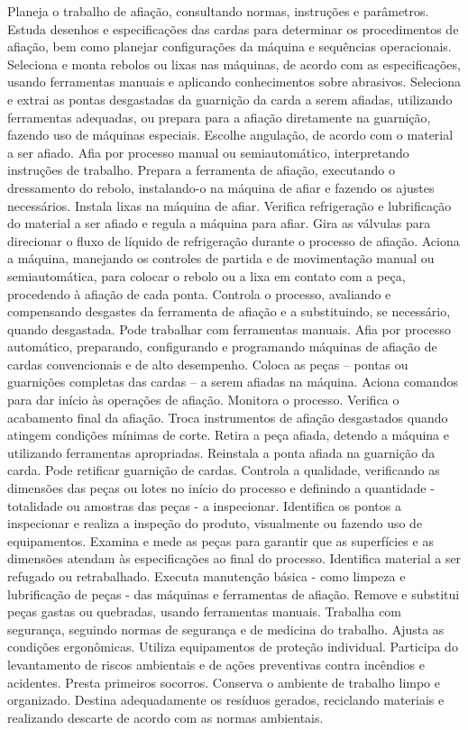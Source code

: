 \documentclass[
]{article}
\begin{document}
Planeja o trabalho de afiação, consultando normas, instruções e
parâmetros. Estuda desenhos e especificações das cardas para determinar
os procedimentos de afiação, bem como planejar configurações da máquina
e sequências operacionais. Seleciona e monta rebolos ou lixas nas
máquinas, de acordo com as especificações, usando ferramentas manuais e
aplicando conhecimentos sobre abrasivos. Seleciona e extrai as pontas
desgastadas da guarnição da carda a serem afiadas, utilizando
ferramentas adequadas, ou prepara para a afiação diretamente na
guarnição, fazendo uso de máquinas especiais. Escolhe angulação, de
acordo com o material a ser afiado. Afia por processo manual ou
semiautomático, interpretando instruções de trabalho. Prepara a
ferramenta de afiação, executando o dressamento do rebolo, instalando-o
na máquina de afiar e fazendo os ajustes necessários. Instala lixas na
máquina de afiar. Verifica refrigeração e lubrificação do material a ser
afiado e regula a máquina para afiar. Gira as válvulas para direcionar o
fluxo de líquido de refrigeração durante o processo de afiação. Aciona a
máquina, manejando os controles de partida e de movimentação manual ou
semiautomática, para colocar o rebolo ou a lixa em contato com a peça,
procedendo à afiação de cada ponta. Controla o processo, avaliando e
compensando desgastes da ferramenta de afiação e a substituindo, se
necessário, quando desgastada. Pode trabalhar com ferramentas manuais.
Afia por processo automático, preparando, configurando e programando
máquinas de afiação de cardas convencionais e de alto desempenho. Coloca
as peças -- pontas ou guarnições completas das cardas -- a serem afiadas
na máquina. Aciona comandos para dar início às operações de afiação.
Monitora o processo. Verifica o acabamento final da afiação. Troca
instrumentos de afiação desgastados quando atingem condições mínimas de
corte. Retira a peça afiada, detendo a máquina e utilizando ferramentas
apropriadas. Reinstala a ponta afiada na guarnição da carda. Pode
retificar guarnição de cardas. Controla a qualidade, verificando as
dimensões das peças ou lotes no início do processo e definindo a
quantidade - totalidade ou amostras das peças - a inspecionar.
Identifica os pontos a inspecionar e realiza a inspeção do produto,
visualmente ou fazendo uso de equipamentos. Examina e mede as peças para
garantir que as superfícies e as dimensões atendam às especificações ao
final do processo. Identifica material a ser refugado ou retrabalhado.
Executa manutenção básica - como limpeza e lubrificação de peças - das
máquinas e ferramentas de afiação. Remove e substitui peças gastas ou
quebradas, usando ferramentas manuais. Trabalha com segurança, seguindo
normas de segurança e de medicina do trabalho. Ajusta as condições
ergonômicas. Utiliza equipamentos de proteção individual. Participa do
levantamento de riscos ambientais e de ações preventivas contra
incêndios e acidentes. Presta primeiros socorros. Conserva o ambiente de
trabalho limpo e organizado. Destina adequadamente os resíduos gerados,
reciclando materiais e realizando descarte de acordo com as normas
ambientais.
\end{document}
